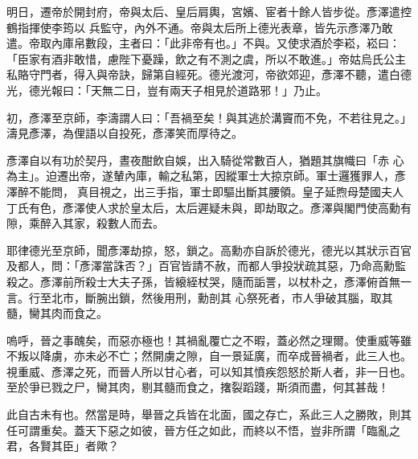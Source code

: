 \begin{pinyinscope}
 明日，遷帝於開封府，帝與太后、皇后肩輿，宮嬪、宦者十餘人皆步從。彥澤遣控鶴指揮使李筠以
 兵監守，內外不通。帝與太后所上德光表章，皆先示彥澤乃敢遣。帝取內庫帛數段，主者曰：「此非帝有也。」不與。又使求酒於李崧，崧曰：「臣家有酒非敢惜，慮陛下憂躁，飲之有不測之虞，所以不敢進。」帝姑烏氏公主私賂守門者，得入與帝訣，歸第自經死。德光渡河，帝欲郊迎，彥澤不聽，遣白德光，德光報曰：「天無二日，豈有兩天子相見於道路邪！」乃止。



 初，彥澤至京師，李濤謂人曰：「吾禍至矣！與其逃於溝竇而不免，不若往見之。」濤見彥澤，為俚語以自投死，彥澤笑而厚待之。



 彥澤自以有功於契丹，晝夜酣飲自娛，出入騎從常數百人，猶題其旗幟曰「赤
 心為主」。迫遷出帝，遂輦內庫，輸之私第，因縱軍士大掠京師。軍士邏獲罪人，彥澤醉不能問，真目視之，出三手指，軍士即驅出斷其腰領。皇子延煦母楚國夫人丁氏有色，彥澤使人求於皇太后，太后遲疑未與，即劫取之。彥澤與閣門使高勳有隙，乘醉入其家，殺數人而去。



 耶律德光至京師，聞彥澤劫掠，怒，鎖之。高勳亦自訴於德光，德光以其狀示百官及都人，問：「彥澤當誅否？」百官皆請不赦，而都人爭投狀疏其惡，乃命高勳監殺之。彥澤前所殺士大夫子孫，皆縗絰杖哭，隨而詬詈，以杖朴之，彥澤俯首無一言。行至北市，斷腕出鎖，然後用刑，勳剖其
 心祭死者，市人爭破其腦，取其髓，臠其肉而食之。



 嗚呼，晉之事醜矣，而惡亦極也！其禍亂覆亡之不暇，蓋必然之理爾。使重威等雖不叛以降虜，亦未必不亡；然開虜之隙，自一景延廣，而卒成晉禍者，此三人也。視重威、彥澤之死，而晉人所以甘心者，可以知其憤疾怨怒於斯人者，非一日也。至於爭已戮之尸，臠其肉，剔其髓而食之，撦裂蹈踐，斯須而盡，何其甚哉！



 此自古未有也。然當是時，舉晉之兵皆在北面，國之存亡，系此三人之勝敗，則其任可謂重矣。蓋天下惡之如彼，晉方任之如此，而終以不悟，豈非所謂「臨亂之君，各賢其臣」者歟？



\end{pinyinscope}